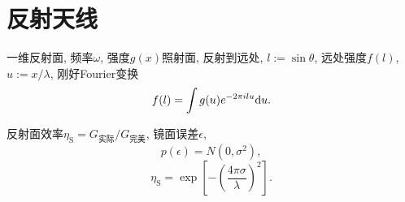 \chapter{反射天线}

一维反射面, 频率$\omega$, 强度$g(x)$照射面, 反射到远处, $l:=\sin\theta$, 远处强度$f(l)$, $u:=x/\lambda$, 刚好Fourier变换
\begin{equation}
    f(l)=\int g(u)e^{-2\pi ilu}\mathrm{d} u.
\end{equation}

反射面效率$\eta_\text{S}=G_\text{实际}/G_\text{完美}$, 镜面误差$\epsilon$,
\begin{equation}
    p(\epsilon)=N(0,\sigma^2),
\end{equation}
\begin{equation}
    \eta_\text{S}=\exp\left[-\left(\frac{4\pi\sigma}{\lambda}\right)^2\right].
\end{equation}
